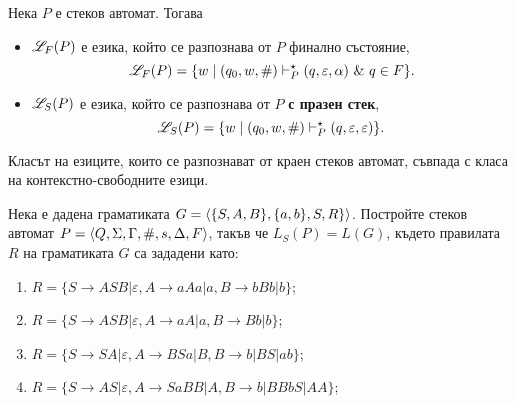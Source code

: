Нека $P$ е стеков автомат. Тогава
\begin{itemize}
\item
  $\mathscr{L}_F(P)$ е езика, който се разпознава от $P$ { финално състояние},
  \[\mathscr{L}_F(P) = \{w\mid (q_0,w,\#) \vdash^\star_P (q,\varepsilon,\alpha)\ \&\ q \in F\}.\]    
\item
  $\mathscr{L}_S(P)$ е езика, който се разпознава от $P$  {\bf с празен стек},
  \[\mathscr{L}_S(P) = \{w\mid (q_0,w,\#) \vdash^\star_P (q,\varepsilon,\varepsilon)\}.\]    
\end{itemize}

\begin{thm}
  Класът на езиците, които се разпознават от краен стеков автомат, съвпада с
  класа на контекстно-свободните езици.
\end{thm}

\begin{problem}
  Нека е дадена граматиката $G = \langle{\{S,A,B\},\{a,b\},S,R\}}\rangle$.
  Постройте стеков автомат $P = \langle{Q,\Sigma,\Gamma,\#,s,\Delta,F}\rangle$, такъв че $L_S(P) = L(G)$, където правилата $R$ на граматиката $G$ са зададени като:
  \begin{enumerate} 
  \item
    $R = \{S\rightarrow ASB\vert \varepsilon, A\rightarrow aAa\vert a, B\rightarrow bBb\vert b\}$;
  \item
    $R = \{S\rightarrow ASB\vert \varepsilon, A\rightarrow aA\vert a, B\rightarrow Bb\vert b\}$;
  \item
    $R =\{S\rightarrow SA|\varepsilon,A\rightarrow BSa|B, B\rightarrow b|BS|ab\}$;
  \item
    $R = \{S\rightarrow AS|\varepsilon,A\rightarrow SaBB|A, B\rightarrow b|BBbS|AA\}$;


\end{enumerate}
\end{problem}

